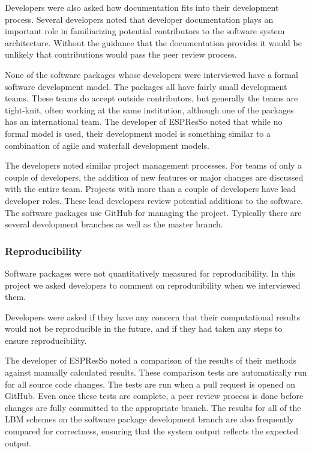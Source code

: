 \documentclass[12pt, notitlepage]{article}
\begin{document}
Developers were also asked how documentation fits into their development process. Several developers noted that developer documentation plays an important role in familiarizing potential contributors to the software system architecture. Without the guidance that the documentation provides it would be unlikely that contributions would pass the peer review process. 

None of the software packages whose developers were interviewed have a formal software development model. The packages all have fairly small development teams. These teams do accept outside contributors, but generally the teams are tight-knit, often working at the same institution, although one of the packages has an international team. The developer of ESPResSo noted that while no formal model is used, their development model is something similar to a combination of agile and waterfall development models. 

The developers noted similar project management processes. For teams of only a couple of developers, the addition of new features or major changes are discussed with the entire team. Projects with more than a couple of developers have lead developer roles. These lead developers review potential additions to the software. The software packages use GitHub for managing the project. Typically there are several development branches as well as the master branch.

\subsubsection{Reproducibility}

Software packages were not quantitatively measured for reproducibility.
In this project we asked developers to comment on reproducibility when we interviewed them.

Developers were asked if they have any concern that their computational results would not be reproducible in the future, and if they had taken any steps to ensure reproducibility.

The developer of ESPResSo noted a comparison of the results of their methods against manually calculated results. These comparison tests are automatically run for all source code changes. The tests are run when a pull request is opened on GitHub. Even once these tests are complete, a peer review process is done before changes are fully committed to the appropriate branch. The results for all of the LBM schemes on the software package development branch are also frequently compared for correctness, ensuring that the system output reflects the expected output.  
\end{document}
